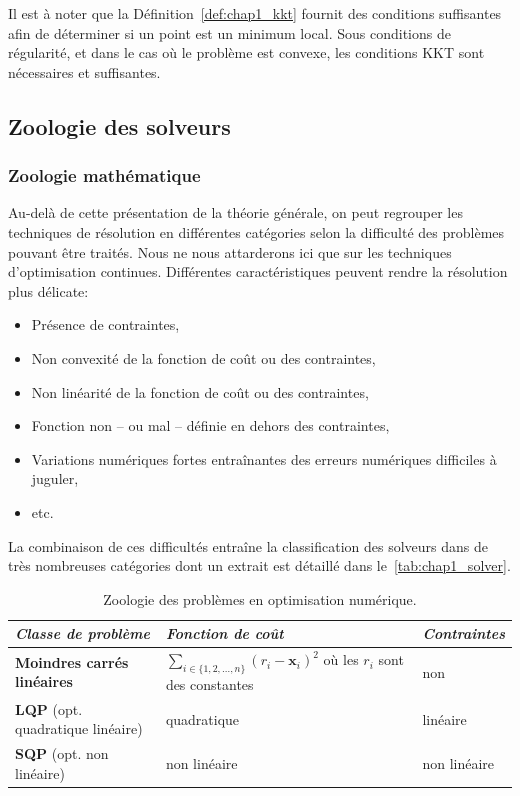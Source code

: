 Il est à noter que la Définition \ref{def:chap1_kkt} fournit des
conditions suffisantes afin de déterminer si un point est un minimum
local. Sous conditions de régularité, et dans le cas où le problème
est convexe, les conditions KKT sont nécessaires et suffisantes.


\subsection{Zoologie des solveurs}\label{sec:chap1_optim_solv}

\subsubsection{Zoologie mathématique}\label{sec:chap1_optim_solv_zoo}


Au-delà de cette présentation de la théorie générale, on peut
regrouper les techniques de résolution en différentes catégories
selon la difficulté des problèmes pouvant être traités. Nous ne nous
attarderons ici que sur les techniques d'optimisation
continues. Différentes caractéristiques peuvent rendre la résolution
plus délicate:
%
\begin{itemize}
\item Présence de contraintes,
\item Non convexité de la fonction de coût ou des contraintes,
\item Non linéarité de la fonction de coût ou des contraintes,
\item Fonction non -- ou mal -- définie en dehors des contraintes,
\item Variations numériques fortes entraînantes des erreurs numériques
  difficiles à juguler,
\item etc.
\end{itemize}
%
La combinaison de ces difficultés entraîne la classification des
solveurs dans de très nombreuses catégories dont un extrait est
détaillé dans le \autoref{tab:chap1_solver}.
%
\begin{table}
\begin{center}
\begin{tabular}{|>{\small}p{}|>{\small}p{}|>{\small}p{}|}
\hline
\textit{Classe de problème} & \textit{Fonction de coût} & \textit{Contraintes}\\
\hline
\textbf{Moindres carrés linéaires} & $\sum_{i \in \{1, 2, \dotsc, n\}} (r_i - \mathbf{x}_i)^2$ où les $r_i$ sont des constantes & non \\
\hline
\textbf{LQP} \small{(opt. quadratique linéaire)} & quadratique & linéaire \\
\hline
\textbf{SQP} \small{(opt. non linéaire)} & non linéaire & non linéaire \\
\hline
\end{tabular}
\end{center}
\caption{Zoologie des problèmes en optimisation
  numérique. \label{tab:chap1_solver}}
\end{table}
